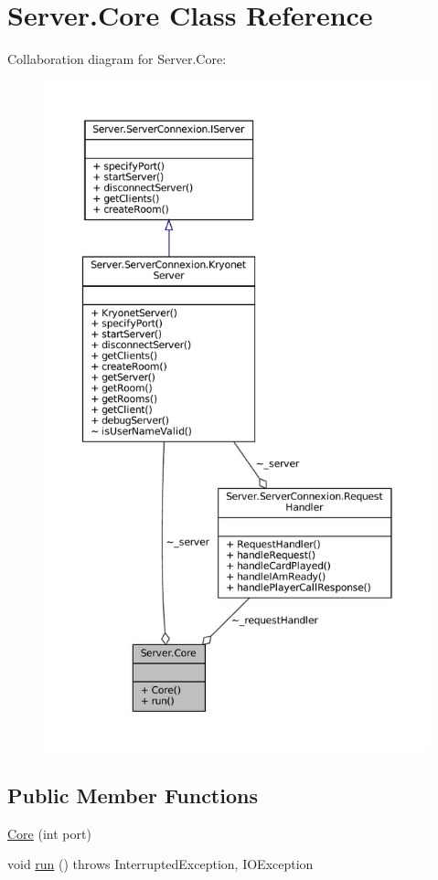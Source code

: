 \hypertarget{classServer_1_1Core}{}\section{Server.\+Core Class Reference}
\label{classServer_1_1Core}


Collaboration diagram for Server.\+Core\+:
\nopagebreak
\begin{figure}[H]
\begin{center}
\leavevmode
\includegraphics[height=550pt]{classServer_1_1Core__coll__graph}
\end{center}
\end{figure}
\subsection*{Public Member Functions}
\begin{DoxyCompactItemize}
\item 
\mbox{\hyperlink{classServer_1_1Core_a84686707df17f13d058e714bfb4ea47c}{Core}} (int port)
\item 
void \mbox{\hyperlink{classServer_1_1Core_aee36e713f04f6094446647d47edf2765}{run}} ()  throws Interrupted\+Exception, I\+O\+Exception 
\end{DoxyCompactItemize}


